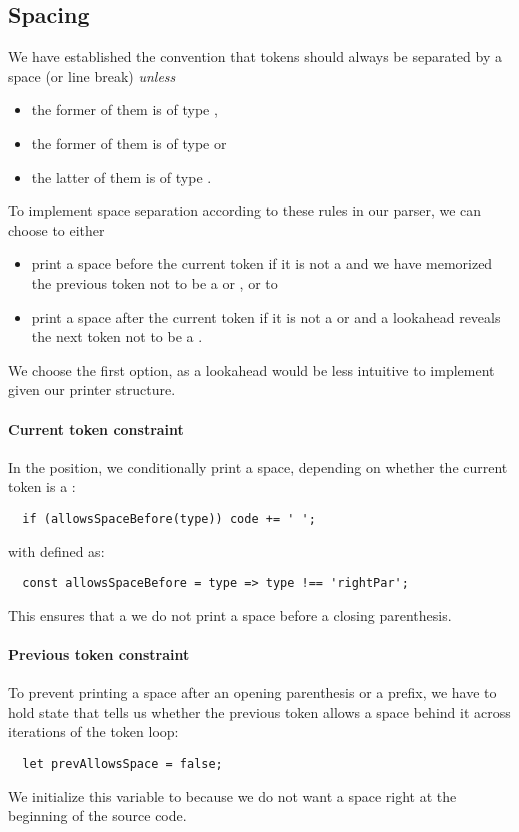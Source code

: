 \subsection{Spacing}
We have established the convention that tokens should
always be separated by a space (or line break) \textit{unless}
\begin{itemize}
  \item the former of them is of type ,
  \item the former of them is of type  or
  \item the latter of them is of type .
\end{itemize}

To implement space separation
according to these rules in our parser,
we can choose to either
\begin{itemize}
  \item print a space before the current token
    if it is not a 
    and we have memorized the previous token not to be
    a  or , or to
  \item print a space after the current token
    if it is not a  or 
    and a lookahead reveals the next token not to be
    a .
\end{itemize}
We choose the first option,
as a lookahead would be less intuitive to implement
given our printer structure.

\paragraph{Current token constraint}
In the  position,
we conditionally print a space,
depending on whether the current token is a :
\begin{verbatim}
  if (allowsSpaceBefore(type)) code += ' ';
\end{verbatim}
with  defined as:
\begin{verbatim}
  const allowsSpaceBefore = type => type !== 'rightPar';
\end{verbatim}
This ensures that a we do not print a space before a closing parenthesis.

\paragraph{Previous token constraint}
To prevent printing a space after an opening parenthesis or a prefix,
we have to hold state that tells us
whether the previous token allows a space behind it
across iterations of the token loop:
\begin{verbatim}
  let prevAllowsSpace = false;
\end{verbatim}
We initialize this variable to 
because we do not want a space
right at the beginning of the source code.

